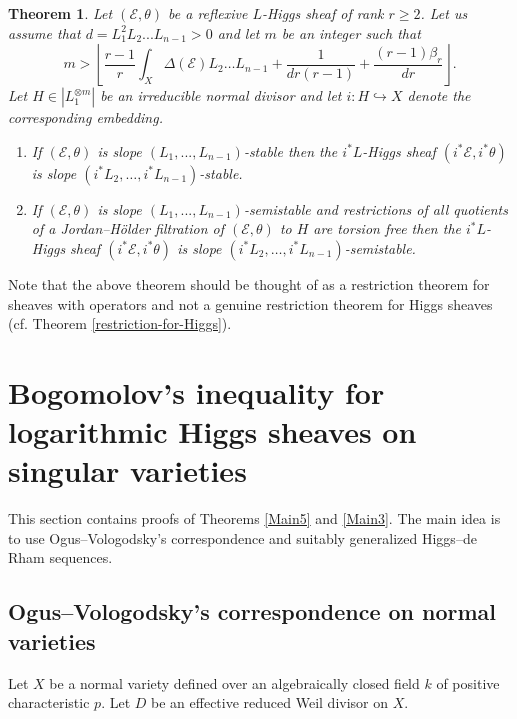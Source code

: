 \documentclass[12pt]{article}
\theoremstyle{plain}
\newtheorem{Theorem}[Thm]{\sc Theorem}
\theoremstyle{definition}
\theoremstyle{remark}
\newcommand{\cE}{{\mathcal E}}
\begin{document}
\begin{Theorem}	\label{restriction-for-operators}
Let  $(\cE , \theta )$ be a reflexive $L$-Higgs sheaf of rank $r\ge 2$. Let us assume that  
$d=L_1^2L_2...L_{n-1}>0$ and let  $m$ be an integer such that
	$$m>\left\lfloor \frac{r-1}{ r}\int_X\Delta (\cE)L_2\dots L_{n-1} +\frac{1}{dr(r-1)}
	+\frac{(r-1)\beta _r}{dr}\right\rfloor .$$
Let $H\in |L_1^{\otimes m}|$  be an irreducible normal divisor and let $i: H\hookrightarrow X$ denote the corresponding embedding.
	\begin{enumerate}
		\item If  $(\cE , \theta )$ is slope $(L_1,...,L_{n-1})$-stable 	then 
		the  $i^*L$-Higgs sheaf $(i^*\cE , i^*\theta )$ is  slope $(i^*L_2,\dots ,i^*L_{n-1})$-stable.
		\item If  $(\cE , \theta )$ is slope $(L_1,...,L_{n-1})$-semistable 
	and restrictions of all quotients of a Jordan--H\"older filtration of $(\cE , \theta )$ to $H$ are torsion free then  	the  $i^*L$-Higgs sheaf $(i^*\cE , i^*\theta )$ is  slope $(i^*L_2,\dots ,i^*L_{n-1})$-semistable. 
	\end{enumerate}
\end{Theorem}

Note that the above theorem should be thought of as a restriction theorem for sheaves with operators and not a genuine restriction theorem for Higgs sheaves (cf. Theorem \ref{restriction-for-Higgs}).






\section{Bogomolov's inequality for logarithmic Higgs sheaves on singular varieties}


This section contains proofs of Theorems  \ref{Main5} and \ref{Main3}. The main idea is to use Ogus--Vologodsky's correspondence and suitably generalized Higgs--de Rham sequences.

\subsection{Ogus--Vologodsky's correspondence on normal varieties}


Let $X$ be a normal variety defined over an algebraically closed field $k$ of positive characteristic $p$.
Let $D$ be an effective reduced Weil divisor on $X$. 

\medskip
\end{document}
